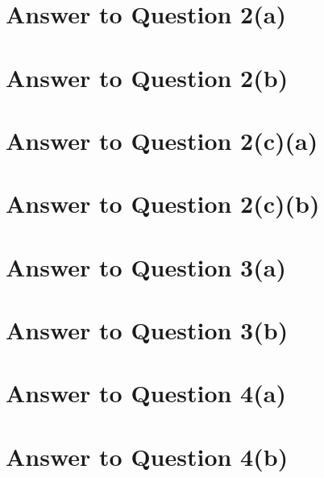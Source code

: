 \documentclass[11pt]{article}
\begin{document}
\section*{Answer to Question 2(a)}

\section*{Answer to Question 2(b)}

\section*{Answer to Question 2(c)(a)}

\section*{Answer to Question 2(c)(b)}

\section*{Answer to Question 3(a)}

\section*{Answer to Question 3(b)}

\section*{Answer to Question 4(a)}

\section*{Answer to Question 4(b)}
\end{document}
